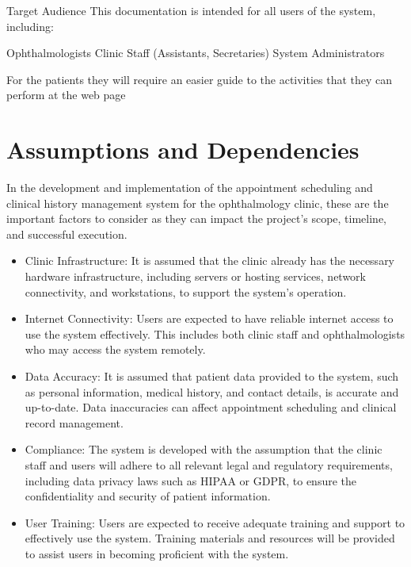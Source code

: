 \documentclass{scrreprt}
\begin{document}
	 Target Audience
	 This documentation is intended for all users of the system, including:
	 
	 Ophthalmologists
	 Clinic Staff (Assistants, Secretaries)
	 System Administrators
	 
	 For the patients they will require an easier guide to the activities that they can perform at the web page
	 \pagebreak
	\section{Assumptions and Dependencies}
	
	 In the development and implementation of the appointment scheduling and clinical history management system for the ophthalmology clinic, these are the important factors to consider as they can impact the project's scope, timeline, and successful execution.
	 
	 \begin{itemize}
	 \item	Clinic Infrastructure: It is assumed that the clinic already has the necessary hardware infrastructure, including servers or hosting services, network connectivity, and workstations, to support the system's operation.
	 	
	 \item	Internet Connectivity: Users are expected to have reliable internet access to use the system effectively. This includes both clinic staff and ophthalmologists who may access the system remotely.
	 	
	 \item	Data Accuracy: It is assumed that patient data provided to the system, such as personal information, medical history, and contact details, is accurate and up-to-date. Data inaccuracies can affect appointment scheduling and clinical record management.
	 	
	 \item	Compliance: The system is developed with the assumption that the clinic staff and users will adhere to all relevant legal and regulatory requirements, including data privacy laws such as HIPAA or GDPR, to ensure the confidentiality and security of patient information.
	 	
	 \item	User Training: Users are expected to receive adequate training and support to effectively use the system. Training materials and resources will be provided to assist users in becoming proficient with the system.
	 	
	 \end{itemize}
	
\end{document}

